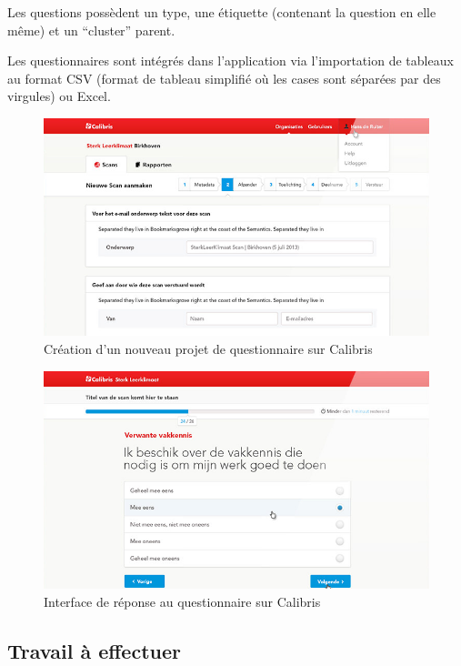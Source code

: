 \documentclass[12pt,a4paper]{book}
\begin{document}
Les questions possèdent un type, une étiquette (contenant la question en elle même) et un ``cluster'' parent.

Les questionnaires sont intégrés dans l'application via l'importation de tableaux au format CSV (format de tableau simplifié où les cases sont séparées par des virgules) ou Excel.

\begin{figure}[htp]
\centering
\includegraphics[scale=0.6]{img/calibris1.png}
 \caption{Création d'un nouveau projet de questionnaire sur Calibris}
 \label{fig.calibris1}
\end{figure}

\begin{figure}[htp]
\centering
\includegraphics[scale=0.6]{img/calibris2.png}
 \caption{Interface de réponse au questionnaire sur Calibris}
 \label{fig.calibris2}
\end{figure}

\subsection{Travail à effectuer}
\end{document}
